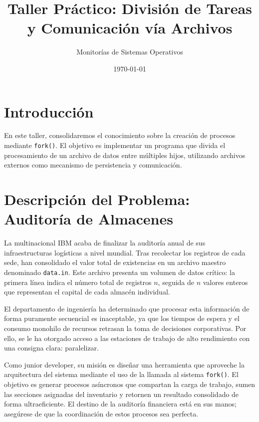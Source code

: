 \documentclass[12pt,a4paper]{article}
\title{\textbf{Taller Práctico: División de Tareas y Comunicación vía Archivos}}
\author{Monitorías de Sistemas Operativos}
\date{\today}
\begin{document}
\maketitle

\section*{Introducción}
En este taller, consolidaremos el conocimiento sobre la creación de procesos mediante \texttt{fork()}. El objetivo es implementar un programa que divida el procesamiento de un archivo de datos entre múltiples hijos, utilizando archivos externos como mecanismo de persistencia y comunicación.

\section*{Descripción del Problema: Auditoría de Almacenes}
La multinacional IBM acaba de finalizar la auditoría anual de sus infraestructuras logísticas a nivel mundial. Tras recolectar los registros de cada sede, han consolidado el valor total de existencias en un archivo maestro denominado \texttt{data.in}. Este archivo presenta un volumen de datos crítico: la primera línea indica el número total de registros $n$, seguida de $n$ valores enteros que representan el capital de cada almacén individual.

\vspace{0.5cm}

El departamento de ingeniería ha determinado que procesar esta información de forma puramente secuencial es inaceptable, ya que los tiempos de espera y el consumo monohilo de recursos retrasan la toma de decisiones corporativas. Por ello, se le ha otorgado acceso a las estaciones de trabajo de alto rendimiento con una consigna clara: paralelizar.

\vspace{0.5cm}

Como junior developer, su misión es diseñar una herramienta que aproveche la arquitectura del sistema mediante el uso de la llamada al sistema \texttt{fork()}. El objetivo es generar procesos asíncronos que compartan la carga de trabajo, sumen las secciones asignadas del inventario y retornen un resultado consolidado de forma ultraeficiente. El destino de la auditoría financiera está en sus manos; asegúrese de que la coordinación de estos procesos sea perfecta.
\end{document}
